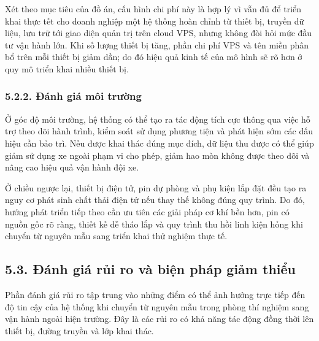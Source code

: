 \documentclass[a4paper]{extarticle}
\begin{document}
Xét theo mục tiêu của đồ án, cấu hình chi phí này là hợp lý vì vẫn đủ để triển
khai thực tết cho doanh nghiệp một hệ thống hoàn chỉnh từ thiết bị, truyền dữ liệu, lưu trữ tới giao diện
quản trị trên cloud VPS, nhưng không đòi hỏi mức đầu tư vận hành lớn. Khi số
lượng thiết bị tăng, phần chi phí VPS và tên miền phân bổ trên mỗi thiết bị giảm
dần; do đó hiệu quả kinh tế của mô hình sẽ rõ hơn ở quy mô triển khai nhiều
thiết bị.

\subsubsection{5.2.2. Đánh giá môi trường}\label{ux111uxe1nh-giuxe1-muxf4i-trux1b0ux1eddng}

Ở góc độ môi trường, hệ thống có thể tạo ra tác động tích cực thông qua việc hỗ
trợ theo dõi hành trình, kiểm soát sử dụng phương tiện và phát hiện sớm các dấu
hiệu cần bảo trì. Nếu được khai thác đúng mục đích, dữ liệu thu được có thể
giúp giảm sử dụng xe ngoài phạm vi cho phép, giảm hao mòn không được theo dõi
và nâng cao hiệu quả vận hành đội xe.

Ở chiều ngược lại, thiết bị điện tử, pin dự phòng và phụ kiện lắp đặt đều tạo ra
nguy cơ phát sinh chất thải điện tử nếu thay thế không đúng quy trình. Do đó,
hướng phát triển tiếp theo cần ưu tiên các giải pháp cơ khí bền hơn, pin có
nguồn gốc rõ ràng, thiết kế dễ tháo lắp và quy trình thu hồi linh kiện hỏng khi
chuyển từ nguyên mẫu sang triển khai thử nghiệm thực tế.

\subsection{5.3. Đánh giá rủi ro và biện pháp giảm thiểu}\label{ux111uxe1nh-giuxe1-rux1ee7i-ro-vuxe0-biux1ec7n-phuxe1p-giux1ea3m-thiux1ec3u}

Phần đánh giá rủi ro tập trung vào những điểm có thể ảnh hưởng trực tiếp đến độ
tin cậy của hệ thống khi chuyển từ nguyên mẫu trong phòng thí nghiệm sang vận
hành ngoài hiện trường. Đây là các rủi ro có khả năng tác động đồng thời lên
thiết bị, đường truyền và lớp khai thác.
\end{document}
